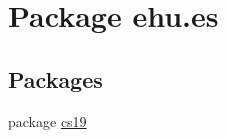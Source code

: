 \hypertarget{namespaceehu_1_1es}{}\section{Package ehu.\+es}
\label{namespaceehu_1_1es}
\subsection*{Packages}
\begin{DoxyCompactItemize}
\item 
package \mbox{\hyperlink{namespaceehu_1_1es_1_1cs19}{cs19}}
\end{DoxyCompactItemize}
